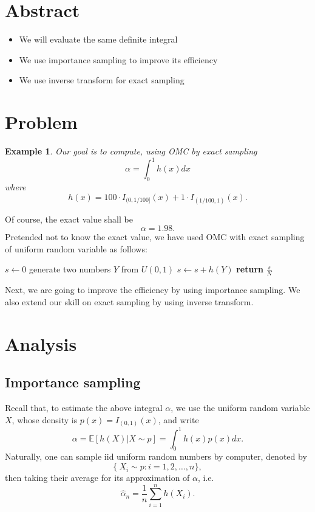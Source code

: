 \documentclass{article}
\newtheorem{example}{Example}
\begin{document}
\section{Abstract}

\begin{itemize}
 \item We will evaluate the same definite integral
 \item We use importance sampling to improve its efficiency
 \item We use inverse transform for exact sampling
\end{itemize}

\section{Problem}

\begin{example}\label{ex:integral}
Our goal is to compute, using OMC by exact sampling
$$\alpha = \int_0^1 h(x) dx$$
where
$$h(x) = 100 \cdot I_{(0, 1/100]}(x) + 1\cdot I_{(1/100, 1)} (x).$$
\end{example}
Of course, the exact value shall be 
$$\alpha = 1.98.$$
Pretended not to know the exact value, we have used OMC with exact sampling of uniform random variable as follows:

\begin{algorithm}
\caption{Integral by MC - Example \ref{ex:integral}}
\label{alg:mcpi}
\begin{algorithmic}[1]
\State  $s \gets 0$ 
	\State generate two numbers $Y$ from $U(0,1)$ 
	\State $s\gets s+h(Y)$ 
\EndFor
\State \textbf{return} $\frac{s}{N}$ 
\EndProcedure
\end{algorithmic}
\end{algorithm}

 

Next, we are going to improve the efficiency by using importance sampling. We also extend our skill on exact sampling by using inverse transform.

\section{Analysis}

\subsection{Importance sampling}
Recall that, to estimate the above integral $\alpha$, 
we use the uniform random variable $X$, 
whose density is $p(x) = I_{(0,1)}(x)$, and write
$$\alpha = \mathbb E[h(X) | X \sim p] = \int_{0}^{1} h(x) p(x) dx.$$
Naturally, one can sample iid uniform random numbers by computer, denoted by
$$\{\ X_i \sim p: i = 1, 2, \ldots, n\} ,$$
then taking their average for its approximation of $\alpha$, i.e.
$$\hat \alpha_n = \frac 1 n \sum_{i=1}^n h(X_i).$$
\end{document}

